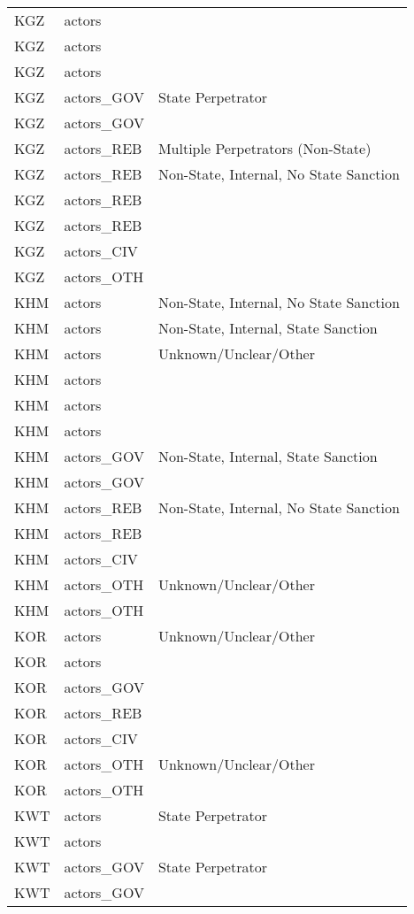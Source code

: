 \begin{table}[ht]
\begin{tabular}{lll}
  KGZ & actors &  \\ 
  KGZ & actors &  \\ 
  KGZ & actors &  \\ 
  KGZ & actors\_GOV & State Perpetrator \\ 
  KGZ & actors\_GOV &  \\ 
  KGZ & actors\_REB & Multiple Perpetrators (Non-State) \\ 
  KGZ & actors\_REB & Non-State, Internal, No State Sanction \\ 
  KGZ & actors\_REB &  \\ 
  KGZ & actors\_REB &  \\ 
  KGZ & actors\_CIV &  \\ 
  KGZ & actors\_OTH &  \\ 
  KHM & actors & Non-State, Internal, No State Sanction \\ 
  KHM & actors & Non-State, Internal, State Sanction \\ 
  KHM & actors & Unknown/Unclear/Other \\ 
  KHM & actors &  \\ 
  KHM & actors &  \\ 
  KHM & actors &  \\ 
  KHM & actors\_GOV & Non-State, Internal, State Sanction \\ 
  KHM & actors\_GOV &  \\ 
  KHM & actors\_REB & Non-State, Internal, No State Sanction \\ 
  KHM & actors\_REB &  \\ 
  KHM & actors\_CIV &  \\ 
  KHM & actors\_OTH & Unknown/Unclear/Other \\ 
  KHM & actors\_OTH &  \\ 
  KOR & actors & Unknown/Unclear/Other \\ 
  KOR & actors &  \\ 
  KOR & actors\_GOV &  \\ 
  KOR & actors\_REB &  \\ 
  KOR & actors\_CIV &  \\ 
  KOR & actors\_OTH & Unknown/Unclear/Other \\ 
  KOR & actors\_OTH &  \\ 
  KWT & actors & State Perpetrator \\ 
  KWT & actors &  \\ 
  KWT & actors\_GOV & State Perpetrator \\ 
  KWT & actors\_GOV &  \\ 

\end{tabular}
\end{table}
